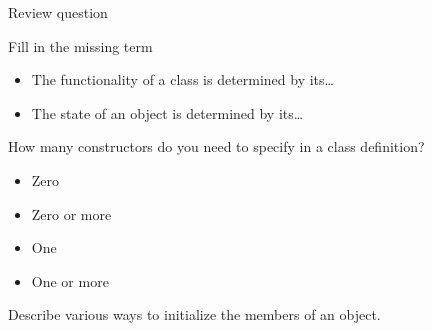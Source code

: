  {Review question}

\begin{exercise}
  \label{ex:class-review1}
  Fill in the missing term
  \begin{itemize}
  \item The functionality of a class is determined by its\ldots
  \item The state of an object is determined by its\ldots
  \end{itemize}

  How many constructors do you need to specify in a class definition?
  \begin{itemize}
  \item Zero
  \item Zero or more
  \item One
  \item One or more
  \end{itemize}
\end{exercise}

\begin{exercise}
  \label{ex:class-review2}
  Describe various ways to initialize the members of an object.
\end{exercise}
